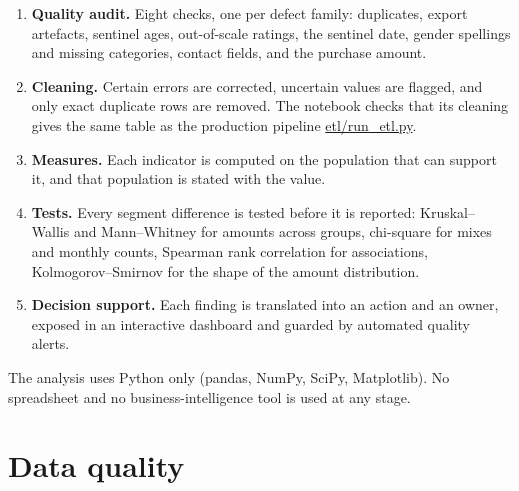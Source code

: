 \documentclass[12pt,a4paper]{article}
\newcommand{\F}[1]{{\small\url{#1}}}
\begin{document}
\begin{enumerate}
\item \textbf{Quality audit.} Eight checks, one per defect family: duplicates, export
artefacts, sentinel ages, out-of-scale ratings, the sentinel date, gender spellings
and missing categories, contact fields, and the purchase amount.
\item \textbf{Cleaning.} Certain errors are corrected, uncertain values are flagged,
and only exact duplicate rows are removed. The notebook checks that its cleaning
gives the same table as the production pipeline \F{etl/run_etl.py}.
\item \textbf{Measures.} Each indicator is computed on the population that can
support it, and that population is stated with the value.
\item \textbf{Tests.} Every segment difference is tested before it is reported:
Kruskal--Wallis and Mann--Whitney for amounts across groups, chi-square for mixes
and monthly counts, Spearman rank correlation for associations, Kolmogorov--Smirnov
for the shape of the amount distribution.
\item \textbf{Decision support.} Each finding is translated into an action and an
owner, exposed in an interactive dashboard and guarded by automated quality alerts.
\end{enumerate}

The analysis uses Python only (pandas, NumPy, SciPy, Matplotlib). No spreadsheet
and no business-intelligence tool is used at any stage.

\section{Data quality}
\end{document}
